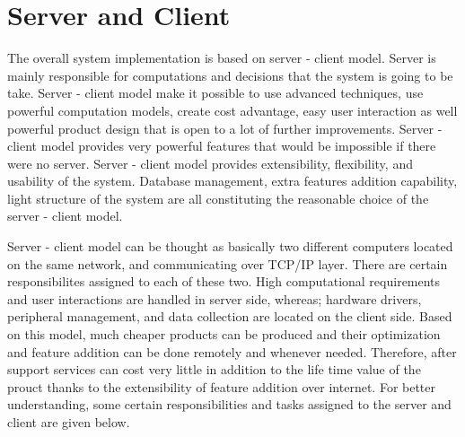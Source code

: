 \section{Server and Client}
\label{sec:serverClient}
The overall system implementation is based on server - client model. Server is mainly responsible for computations and decisions that the system is going to be take. Server - client model make it possible to use advanced techniques, use powerful computation models, create cost advantage, easy user interaction as well powerful product design that is open to a lot of further improvements. Server - client model provides very powerful features that would be impossible if there were no server. Server - client model provides extensibility, flexibility, and usability of the system. Database management, extra features addition capability, light structure of the system are all constituting the reasonable choice of the server - client model.

Server - client model can be thought as basically two different computers located on the same network, and communicating over TCP/IP layer. There are certain responsibilites assigned to each of these two. High computational requirements and user interactions are handled in server side, whereas; hardware drivers, peripheral management, and data collection are located on the client side. Based on this model, much cheaper products can be produced and their optimization and feature addition can be done remotely and whenever needed. Therefore, after support services can cost very little in addition to the life time value of the prouct thanks to the extensibility of feature addition over internet. For better understanding, some certain responsibilities and tasks assigned to the server and client are given below.

